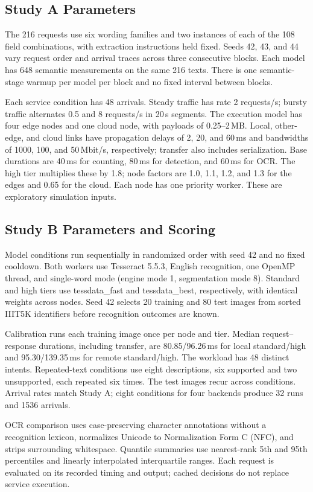 \subsection{Study A Parameters}
The 216 requests use six wording families and two instances of each of the
108 field combinations, with extraction instructions held fixed. Seeds 42,
43, and 44 vary request order and arrival traces across three consecutive
blocks. Each model has 648 semantic measurements on the same 216 texts.
There is one semantic-stage warmup per model per block and no fixed interval
between blocks.

Each service condition has 48 arrivals. Steady traffic has rate 2 requests/s;
bursty traffic alternates 0.5 and 8 requests/s in 20\,s segments. The execution
model has four edge nodes and one cloud node, with payloads of 0.25--2\,MB.
Local, other-edge, and cloud links have propagation delays of 2, 20, and
60\,ms and bandwidths of 1000, 100, and 50\,Mbit/s, respectively; transfer
also includes serialization. Base durations are 40\,ms for counting, 80\,ms
for detection, and 60\,ms for OCR. The high tier multiplies these by 1.8;
node factors are 1.0, 1.1, 1.2, and 1.3 for the edges and 0.65 for the cloud.
Each node has one priority worker. These are exploratory simulation inputs.

\subsection{Study B Parameters and Scoring}
Model conditions run sequentially in randomized order with seed 42 and no
fixed cooldown. Both workers use Tesseract 5.5.3, English recognition,
one OpenMP thread, and single-word mode (engine mode 1, segmentation mode 8).
Standard and high tiers use tessdata\_fast and tessdata\_best, respectively,
with identical weights across nodes. Seed 42 selects 20 training and 80 test
images from sorted IIIT5K identifiers before recognition outcomes are known.

Calibration runs each training image once per node and tier. Median
request--response durations, including transfer, are 80.85/96.26\,ms for
local standard/high and 95.30/139.35\,ms for remote standard/high.
The workload has 48 distinct intents. Repeated-text conditions use eight
descriptions, six supported and two unsupported, each repeated six times.
The test images recur across conditions. Arrival rates match Study A;
eight conditions for four backends produce 32 runs and 1536 arrivals.

OCR comparison uses case-preserving character annotations without a
recognition lexicon, normalizes Unicode to Normalization Form C (NFC), and
strips surrounding whitespace. Quantile summaries use nearest-rank 5th and
95th percentiles and linearly interpolated interquartile ranges. Each
request is evaluated on its recorded timing and output; cached decisions
do not replace service execution.
